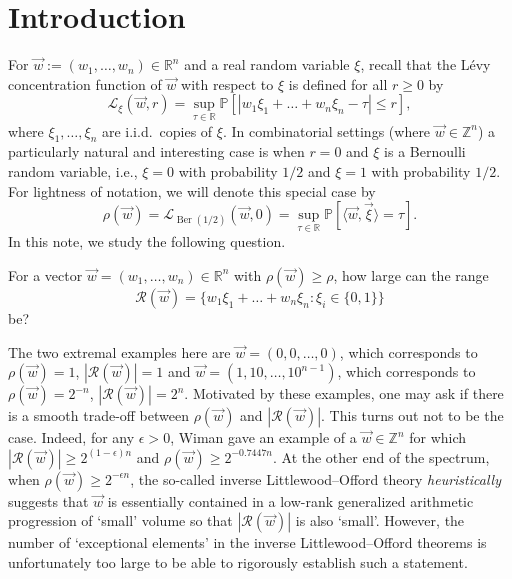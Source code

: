\documentclass[11pt]{article}
\numberwithin{equation}{section}
\theoremstyle{definition}
\theoremstyle{remark}
\newcommand{\sang}[1]{\langle #1 \rangle}
\newcommand{\mb}{\mathbb}
\newcommand{\mc}{\mathcal}
\newcommand{\on}{\operatorname}
\begin{document}
\section{Introduction} \label{sec:introduction}
For $\vec{w} := (w_1,\dots, w_n) \in \mb{R}^{n}$ and a real random variable $\xi$, recall that the L\'evy concentration function of $\vec{w}$ with respect to $\xi$ is defined for all $r\ge 0$ by
\[\mc{L}_{\xi}(\vec{w},r) = \sup_{\tau \in \mb{R}}\mb{P}[|w_1 \xi_1 + \dots + w_n \xi_n - \tau| \le r],\]
where $\xi_1,\dots, \xi_n$ are i.i.d.\ copies of $\xi$. In combinatorial settings (where $\vec{w} \in \mb{Z}^{n}$) a particularly natural and interesting case is when $r = 0$ and $\xi$ is a Bernoulli random variable, i.e., $\xi = 0$ with probability $1/2$ and $\xi = 1$ with probability $1/2$. For lightness of notation, we will denote this special case by
\[\rho(\vec{w}) = \mc{L}_{\on{Ber}(1/2)}(\vec{w},0) = \sup_{\tau\in\mb{R}}\mb{P}[\sang{\vec{w},\vec{\xi}}=\tau].\]
In this note, we study the following question.
\begin{question}
\label{question}
For a vector $\vec{w} = (w_1,\dots, w_n) \in \mb{R}^{n}$ with $\rho(\vec{w}) \ge \rho$, how large can the range
\[\mc{R}(\vec{w}) = \{w_1\xi_1 + \dots + w_n \xi_n: \xi_i \in \{0, 1\}\}\]
be?
\end{question}
The two extremal examples here are $\vec{w} = (0,0,\dots,0)$, which corresponds to $\rho(\vec{w}) = 1$, $|\mc{R}(\vec{w})| = 1$ and $\vec{w} = (1,10,\dots,10^{n-1})$, which corresponds to $\rho(\vec{w}) = 2^{-n}$, $|\mc{R}(\vec{w})| = 2^{n}$. Motivated by these examples, one may ask if there is a smooth trade-off between $\rho(\vec{w})$ and $|\mc{R}(\vec{w})|$. This turns out not to be the case. Indeed, for any $\epsilon > 0$, Wiman \cite{W17} gave an example of a $\vec{w} \in \mb{Z}^{n}$ for which $|\mc{R}(\vec{w})| \ge 2^{(1-\epsilon)n}$ and $\rho(\vec{w}) \ge 2^{-0.7447n}$. At the other end of the spectrum, when $\rho(\vec{w}) \ge 2^{-\epsilon n}$, the so-called inverse Littlewood--Offord theory \cite{RV08, TV09, NV11} \emph{heuristically} suggests that $\vec{w}$ is essentially contained in a low-rank generalized arithmetic progression of `small' volume so that $|\mc{R}(\vec{w})|$ is also `small'. However, the number of `exceptional elements' in the inverse Littlewood--Offord theorems \cite{RV08, TV09, NV11} is unfortunately too large to be able to rigorously establish such a statement.   
\end{document}
